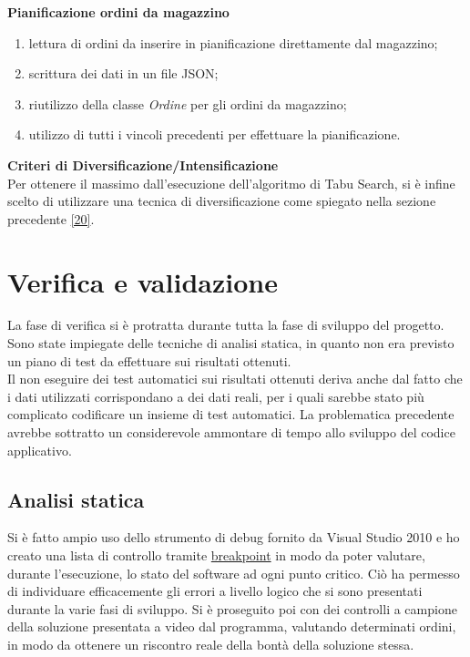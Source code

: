 \textbf{Pianificazione ordini da magazzino} 
\begin{enumerate}
        \item lettura di ordini da inserire in pianificazione direttamente dal magazzino;
        \item scrittura dei dati in un file JSON;
        \item riutilizzo della classe \textit{Ordine} per gli ordini da magazzino;
        \item utilizzo di tutti i vincoli precedenti per effettuare la pianificazione.\\
\end{enumerate}

\textbf{Criteri di Diversificazione/Intensificazione}\\ 

Per ottenere il massimo dall'esecuzione dell'algoritmo di Tabu Search, si è infine scelto di utilizzare una tecnica di diversificazione come spiegato nella sezione precedente \hyperref[criteria]{[20]}.

\newpage

\section{Verifica e validazione}

La fase di verifica si è protratta durante tutta la fase di sviluppo del progetto. Sono state impiegate delle tecniche di analisi statica, in quanto non era previsto un piano di test
da effettuare sui risultati ottenuti.\\ Il non eseguire dei test automatici sui risultati ottenuti deriva anche dal fatto che i dati utilizzati corrispondano
a dei dati reali, per i quali sarebbe stato più complicato codificare un insieme di test automatici. La problematica precedente avrebbe sottratto un considerevole ammontare di tempo allo sviluppo del
codice applicativo. 

\subsection{Analisi statica}

Si è fatto ampio uso dello strumento di debug fornito da Visual Studio 2010 e ho creato una lista di controllo tramite \hyperref[Breakpoint]{breakpoint\glo} in modo da poter
valutare, durante l'esecuzione, lo stato del software ad ogni punto critico. Ciò ha permesso di individuare efficacemente gli errori a livello logico che si sono presentati
durante la varie fasi di sviluppo. Si è proseguito poi con dei controlli a campione della soluzione presentata a video dal programma, 
valutando determinati ordini, in modo da ottenere un riscontro reale della bontà della soluzione stessa. 


